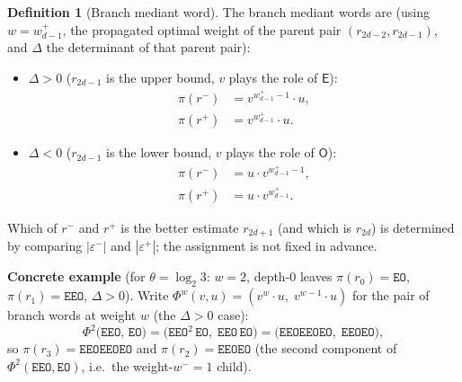 \documentclass[12pt]{article}
\theoremstyle{definition}
\newtheorem{definition}[theorem]{Definition}
\theoremstyle{remark}
\theoremstyle{plain}
\newcommand{\eps}{\varepsilon}
\newcommand{\OO}{\mathsf{O}}
\newcommand{\EE}{\mathsf{E}}
\newcommand{\Dval}{\Delta}
\newcommand{\epsplus}{\eps^{+}}
\newcommand{\epsminus}{\eps^{-}}
\begin{document}
\begin{definition}[Branch mediant word]
The branch mediant words are (using $w = w^+_{d-1}$, the propagated optimal weight of the parent pair $(r_{2d-2}, r_{2d-1})$, and $\Dval$ the determinant of that parent pair):
\begin{itemize}
  \item $\Dval > 0$ ($r_{2d-1}$ is the upper bound, $v$ plays the role of $\EE$):
    \begin{align*}
      \pi(r^-) &= v^{w^+_{d-1}-1} \cdot u, \\
      \pi(r^+) &= v^{w^+_{d-1}} \cdot u.
    \end{align*}
  \item $\Dval < 0$ ($r_{2d-1}$ is the lower bound, $v$ plays the role of $\OO$):
    \begin{align*}
      \pi(r^-) &= u \cdot v^{w^+_{d-1}-1}, \\
      \pi(r^+) &= u \cdot v^{w^+_{d-1}}.
    \end{align*}
\end{itemize}
Which of $r^-$ and $r^+$ is the better estimate $r_{2d+1}$ (and which is $r_{2d}$)
is determined by comparing $|\epsminus|$ and $|\epsplus|$; the assignment is not
fixed in advance.
\end{definition}

\textbf{Concrete example} (for $\theta = \log_2 3$: $w = 2$, depth-$0$ leaves
$\pi(r_0) = \mathtt{EO}$, $\pi(r_1) = \mathtt{EEO}$, $\Dval > 0$).
Write $\Phi^w(v, u) = (v^w \cdot u,\; v^{w-1} \cdot u)$ for the pair of branch words
at weight $w$ (the $\Dval > 0$ case):
\[
  \Phi^2\bigl(\mathtt{EEO},\, \mathtt{EO}\bigr)
  = \bigl(\mathtt{EEO}^2\,\mathtt{EO},\; \mathtt{EEO}\,\mathtt{EO}\bigr)
  = \bigl(\mathtt{EEOEEOEO},\; \mathtt{EEOEO}\bigr),
\]
so $\pi(r_3) = \mathtt{EEOEEOEO}$ and $\pi(r_2) = \mathtt{EEOEO}$
(the second component of $\Phi^2(\mathtt{EEO}, \mathtt{EO})$, i.e.\ the weight-$w^- = 1$ child).
\end{document}
